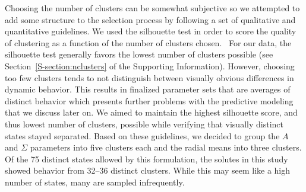 \documentclass[journal=jpcbfk,manuscript=article]{achemso}
\begin{document}
%   
  
  Choosing the number of clusters can be somewhat subjective so
  we attempted to add some structure to the selection process by following
  a set of qualitative and quantitative guidelines. We used the silhouette 
  test in order to score the quality of clustering as a function of the number 
  of clusters chosen.~\cite{kaufman_finding_2009} For our data, the silhouette test generally favors the 
  lowest number of clusters possible (see Section~\ref{S-section:nclusters} of
  the Supporting Information). However, choosing too few clusters tends to 
  not distinguish between visually obvious differences in 
  dynamic behavior. This results in finalized parameter sets that are averages of
  distinct behavior which presents further problems with the predictive modeling
  that we discuss later on. We aimed to maintain the highest silhouette score,
  and thus lowest number of clusters, possible while verifying that visually 
  distinct states stayed separated. Based on these guidelines, we decided to 
  group the $A$ and $\Sigma$ parameters into five clusters each and the radial
  means into three clusters. Of the 75 distinct states allowed by this formulation,
  the solutes in this study showed behavior from 32--36 distinct clusters. While
  this may seem like a high number of states, many are sampled infrequently.
\end{document}
